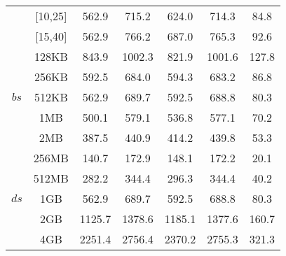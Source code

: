\documentclass[10pt,journal,compsoc]{IEEEtran}
\begin{document}
\begin{appendices}
\begin{table}[!htb]
{\begin{tabular}{c|c|c|c|c|c|c}
  &  [10,25]  &  562.9  &  715.2  &  624.0  &  714.3  &  84.8\\
  &  [15,40] &  562.9  &  766.2  &  687.0  &  765.3  &  92.6\\
  \hline
\multirow{5}{*}{$bs$}  &  128KB  &  843.9  &  1002.3  &  821.9  &  1001.6  &  127.8\\
  &   256KB  &  592.5  &  684.0  &  594.3  &  683.2  &  86.8\\
  &   512KB  &  562.9  &  689.7  &  592.5  &  688.8  &  80.3\\
  &   1MB  &  500.1  &  579.1  &  536.8  &  577.1  &  70.2\\
  &   2MB  &  387.5  &  440.9  &  414.2  &  439.8  &  53.3\\
  \hline
\multirow{5}{*}{$ds$}  &  256MB  &  140.7  &  172.9  &  148.1  &  172.2  &  20.1\\
  &   512MB  &  282.2  &  344.4  &  296.3  &  344.4  &  40.2\\
  &   1GB  &  562.9  &  689.7  &  592.5  &  688.8  &  80.3\\
  &   2GB  &  1125.7  &  1378.6  &  1185.1  &  1377.6  &  160.7\\
  &   4GB  &  2251.4  &  2756.4  &  2370.2  &  2755.3  &  321.3\\
    \hline
    \hline
\end{tabular}}
\end{table}





\end{appendices}
\end{document}
